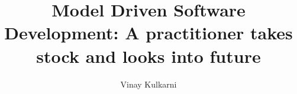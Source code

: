 
  \title{Model Driven Software Development: A practitioner takes stock and looks into future}

  \author{Vinay Kulkarni}

  
\maketitle
\clearpage
\setcounter{page}{226}